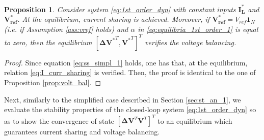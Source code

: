 \documentclass[a4paper]{article}
\theoremstyle{plain}
\newtheorem{prp}{Proposition}
\begin{document}
\begin{prp}
	\label{prop:volt_bal_2}
	Consider system \eqref{eq:1st_order_dyn} with constant inputs
	$\mathbf{I_{L}^*} $ and $\mathbf{ V_{ref}^*}$. At the equilibrium,
	current sharing is achieved. Moreover, if $\mathbf{V_{ref}^*} =
	V_{ref}\mathbf{1}_N$ (i.e. if Assumption \ref{ass:vref} holds) and
	$\alpha$ in \eqref{eq:equilibria_1st_order_1} is equal to zero, then
	the equilibrium $[\mathbf{\Delta V^*}^T,\mathbf{V^*}^T]^T$ verifies the voltage balancing.
\end{prp}
\begin{proof}
	Since equation \eqref{eq:ss_simpl_1} holds, one has that, at the
	equilibrium, relation \eqref{eq:I_curr_sharing} is verified. Then, the
	proof is  identical to the one of Proposition \ref{prop:volt_bal}.
\end{proof}
Next, similarly to the simplified case described in Section \ref{sec:st_an_1}, we evaluate the stability properties of the closed-loop system \eqref{eq:1st_order_dyn} so as to show the convergence of state $[\mathbf{\Delta V}^T \mathbf{V}^T]^T$ to an equilibrium which guarantees current sharing and voltage balancing.
\end{document}
